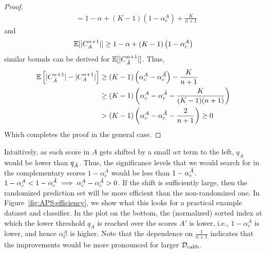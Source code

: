 \begin{proof}
\begin{align*}
     &= 1 - \alpha + (K-1)\left( 1 - \alpha_c^A\right) + \frac{K}{n+1}
\end{align*}
and 
\[
    \mathbb{E}[\lvert C_{A}^{n+1}\rvert] \geq 1 - \alpha + (K-1)\left(1 - \alpha_c^A\right)
\]
similar bounds can be derived for $\mathbb{E}[\lvert C_{\Tilde{A}}^{n+1}\rvert]$.
Thus, 
\begin{align*}
    \mathbb{E}\left[|C_{\Tilde{A}}^{n+1}| - |C_{A}^{n+1}|\right] &\geq (K-1)\left(\alpha_c^A - \alpha_c^{\Tilde{A}}\right) - \frac{K}{n+1} \\
    &\geq (K-1) \left(\alpha_c^A - \alpha_c^{\Tilde{A}} - \frac{K}{(K-1)(n+1)}\right)\\
    & >  (K-1)\left(\alpha_c^A - \alpha_c^{\Tilde{A}} - \frac{2}{n+1}\right) \geq 0
\end{align*}
Which completes the proof in the general case.

\end{proof}
Intuitively, as each score in $A$ gets shifted by a small $u\pi$ term to the left, $q_A$ would be lower than $q_{\Tilde{A}}$.
Thus, the significance levels that we would search for in the complementary scores $1-\alpha_c^A$ would be less than $1-\alpha_c^{\Tilde{A}}$.
$1 - \alpha_c^A < 1 - \alpha_c^{\Tilde{A}} \implies \alpha_c^A - \alpha_c^{\Tilde{A}} > 0$.
If the shift is sufficiently large, then the randomized prediction set will be more efficient than the non-randomized one.
In Figure~\ref{fig:APS:efficiency}, we show what this looks for a practical example dataset and classifier.
In the plot on the bottom, the (normalized) sorted index at which the lower threshold $q_A$ is reached over the scores $A'$ is lower, i.e., $1 - \alpha_c^A$ is lower, and hence $\alpha_C^A$ is higher.
Note that the dependence on $\frac{1}{n+1}$ indicates that the improvements would be more pronounced for larger $\mathcal{D_{\mathrm{calib}}}$.

